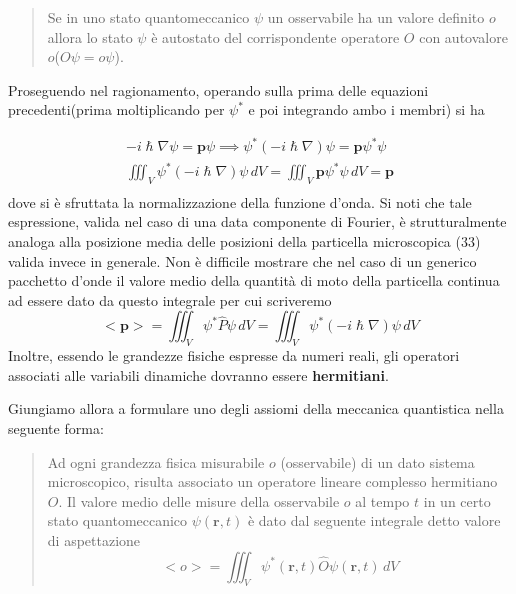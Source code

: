 \begin{quote}
    Se in uno stato quantomeccanico \(\psi\) un osservabile ha un valore
    definito \(o\) allora lo stato \(\psi\) è autostato del corrispondente
    operatore \(O\) con autovalore \(o\)(\(O \psi = o \psi\)).
\end{quote}

Proseguendo nel ragionamento, operando sulla prima delle equazioni
precedenti(prima moltiplicando per \(\psi^{*}\) e poi integrando ambo i
membri) si ha

\begin{gather*}
    - i \hslash \nabla \psi = \bm{p} \psi \implies
    \psi^{*}(-i \hslash \nabla) \psi = \bm{p} \psi^{*}\psi\\
    \iiint_{V} \psi^{*}(-i \hslash \nabla) \psi \, dV = \iiint_{V} \bm{p} \psi^{*}\psi \, dV = \bm{p}\\
\end{gather*} dove si è sfruttata la normalizzazione della funzione d'onda.
Si noti
che tale espressione, valida nel caso di una data componente di Fourier,
è strutturalmente analoga alla posizione media delle posizioni della
particella microscopica (\(33\)) valida invece in generale.
Non è
difficile mostrare che nel caso di un generico pacchetto d'onde il
valore medio della quantità di moto della particella continua ad essere
dato da questo integrale per cui scriveremo \[
                                                <\bm{p}> = \iiint_{V} \psi^{*}\hat{P}\psi \, dV = \iiint_{V} \psi^{*}(- i \hslash \nabla )\psi \, dV
\] Inoltre, essendo le grandezze fisiche espresse da numeri reali, gli
operatori associati alle variabili dinamiche dovranno essere
\textbf{hermitiani}.

Giungiamo allora a formulare uno degli assiomi della meccanica
quantistica nella seguente forma:

\begin{quote}
    Ad ogni grandezza fisica misurabile \(o\) (osservabile) di un dato
    sistema microscopico, risulta associato un operatore lineare complesso
    hermitiano \(O\).
    Il valore medio delle misure della osservabile \(o\)
    al tempo \(t\) in un certo stato quantomeccanico \(\psi(\bm{r},t)\) è
    dato dal seguente integrale detto valore di aspettazione \[
                                                                 \boxed{<o> = \iiint_{V} \psi^{*}(\bm{r},t)\hat{O}\psi(\bm{r},t) \, dV}
    \]
\end{quote}


